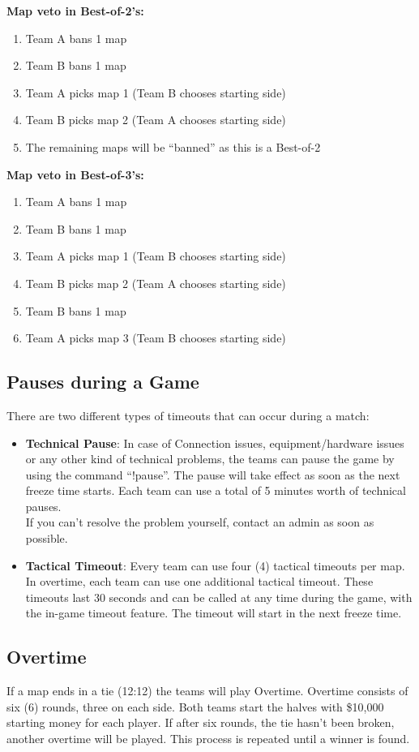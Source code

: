 \documentclass{article}
\newcommand{\TeamA}{{\color{red}Team A }}
\newcommand{\TeamB}{{\color{blue}Team B }}
\begin{document}
\textbf{Map veto in Best-of-2's:}
\begin{enumerate}
    \item \TeamA bans 1 map
    \item \TeamB bans 1 map
    \item \TeamA picks map 1 (\TeamB chooses starting side)
    \item \TeamB picks map 2 (\TeamA chooses starting side)
    \item The remaining maps will be “banned” as this is a Best-of-2
\end{enumerate}

\textbf{Map veto in Best-of-3's:}
\begin{enumerate}
    \item \TeamA bans 1 map
    \item \TeamB bans 1 map
    \item \TeamA picks map 1 (\TeamB chooses starting side)
    \item \TeamB picks map 2 (\TeamA chooses starting side)
    \item \TeamB bans 1 map
    \item \TeamA picks map 3 (\TeamB chooses starting side)
\end{enumerate}

\subsection{Pauses during a Game}
There are two different types of timeouts that can occur during a match:
\begin{itemize}
    \item \textbf{Technical Pause}: In case of Connection issues, equipment/hardware issues or any other kind of technical problems, the teams can pause the game by using the command “!pause”. The pause will take effect as soon as the next freeze time starts. Each team can use a total of 5 minutes worth of technical pauses.\\
    If you can't resolve the problem yourself, contact an admin as soon as possible.
    \item \textbf{Tactical Timeout}: Every team can use four (4) tactical timeouts per map. In overtime, each team can use one additional tactical timeout. These timeouts last 30 seconds and can be called at any time during the game, with the in-game timeout feature. The timeout will start in the next freeze time.

\end{itemize}

\subsection{Overtime}
If a map ends in a tie (12:12) the teams will play Overtime. Overtime consists of six (6) rounds, three on each side. Both teams
start the halves with \$10,000 starting money for each player. If after six rounds, the tie hasn't been broken, another overtime will be played. This process is repeated until a winner is found. 
\end{document}
